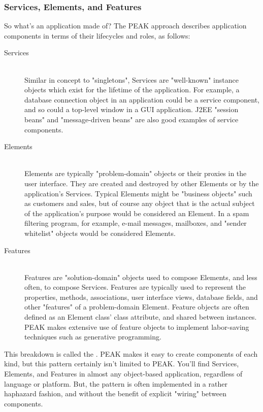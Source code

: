 \vfill






\subsubsection{Services, Elements, and Features}

So what's an application made of?  The PEAK approach describes application
components in terms of their lifecycles and roles, as follows:

\begin{description}

\item[Services] \hfill \\ 
Similar in concept to "singletons", Services are "well-known" instance objects
which exist for the lifetime of the application.  For example, a database
connection object in an application could be a service component, and so could
a top-level window in a GUI application.  J2EE "session beans" and
"message-driven beans" are also good examples of service components.

\item[Elements] \hfill \\ 
Elements are typically "problem-domain" objects or their proxies in
the user interface.  They are created and destroyed by other Elements or
by the application's Services.  Typical Elements might be "business objects"
such as customers and sales, but of course any object that is the actual
subject of the application's purpose would be considered an Element.  In a
spam filtering program, for example, e-mail messages, mailboxes, and
"sender whitelist" objects would be considered Elements.

\item[Features] \hfill \\
Features are "solution-domain" objects used to compose Elements, and less
often, to compose Services.  Features are typically used to represent 
the properties, methods, associations, user interface views, database fields,
and other "features" of a problem-domain Element.  Feature objects are often
defined as an Element class' class attribute, and shared between instances.
PEAK makes extensive use of feature objects to implement labor-saving
techniques such as generative programming.

\end{description}

This breakdown is called the .
PEAK makes it easy to create components of each kind, but this pattern 
certainly isn't limited to PEAK.  You'll find Services, Elements, and Features
in almost any object-based application, regardless of language or platform.
But, the pattern is often implemented in a rather haphazard fashion, and
without the benefit of explicit "wiring" between components.

